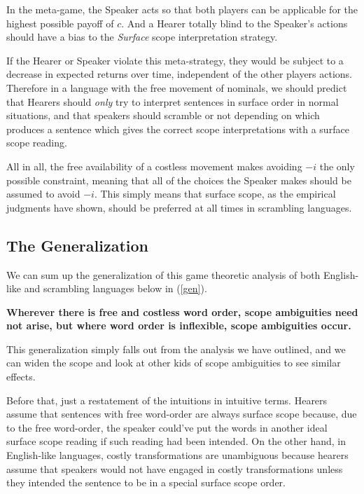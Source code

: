 \documentclass{article}
\begin{document}
In the meta-game, the Speaker acts so that both players can be applicable for the highest possible payoff of $c$.
And a Hearer totally blind to the Speaker's actions should have a bias to the \emph{Surface} scope interpretation strategy.

If the Hearer or Speaker violate this meta-strategy, they would be subject to a decrease in expected returns over time, independent of the other players actions.
Therefore in a language with the free movement of nominals, we should predict that Hearers should \emph{only} try to interpret sentences in surface order in normal situations, and that speakers should scramble or not depending on which produces a sentence which gives the correct scope interpretations with a surface scope reading.

All in all, the free availability of a costless movement makes avoiding $-i$ the only possible constraint, meaning that all of the choices the Speaker makes should be assumed to avoid $-i$.
This simply means that surface scope, as the empirical judgments have shown, should be preferred at all times in scrambling languages.

\subsection{The Generalization}

We can sum up the generalization of this game theoretic analysis of both English-like and scrambling languages below in (\ref{gen}).

\begin{exe}
\ex \textbf{Wherever there is free and costless word order, scope ambiguities need not arise, but where word order is inflexible, scope ambiguities occur.
\label{gen}}
\end{exe}

This generalization simply falls out from the analysis we have outlined, and we can widen the scope and look at other kids of scope ambiguities to see similar effects.

Before that, just a restatement of the intuitions in intuitive terms.
Hearers assume that sentences with free word-order are always surface scope because, due to the free word-order, the speaker could've put the words in another ideal surface scope reading if such reading had been intended.
On the other hand, in English-like languages, costly transformations are unambiguous because hearers assume that speakers would not have engaged in costly transformations unless they intended the sentence to be in a special surface scope order.
\end{document}
